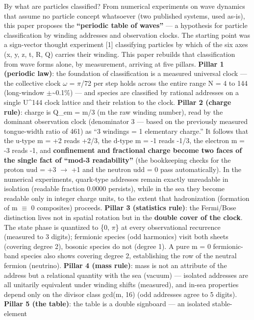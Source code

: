 \documentclass[
]{article}
\begin{document}
By what are particles classified? From numerical experiments on wave
dynamics that assume no particle concept whatsoever (two published
systems, used as-is), this paper proposes the \textbf{``periodic table
of waves''} --- a hypothesis for particle classification by winding
addresses and observation clocks. The starting point was a sign-vector
thought experiment {[}1{]} classifying particles by which of the six
axes (x, y, z, t, R, Q) carries their winding. This paper rebuilds that
classification from wave forms alone, by measurement, arriving at five
pillars. \textbf{Pillar 1 (periodic law)}: the foundation of
classification is a measured universal clock --- the collective clock
\(\omega\) = \(\pi\)/72 per step holds across the entire range N = 4 to
144 (long-window \(\pm\)\textasciitilde0.1\%) --- and species are
classified by rational addresses on a single U\^{}144 clock lattice and
their relation to the clock. \textbf{Pillar 2 (charge rule)}: charge is
Q\_em = m/3 (m the raw winding number), read by the dominant observation
clock (denominator 3 --- based on the previously measured tongue-width
ratio of 461) as ``3 windings = 1 elementary charge.'' It follows that
the u-type m = +2 reads +2/3, the d-type m = -1 reads -1/3, the electron
m = -3 reads -1, and \textbf{confinement and fractional charge become
two faces of the single fact of ``mod-3 readability''} (the bookkeeping
checks for the proton uud = +3 \(\to\) +1 and the neutron udd = 0 pass
automatically). In the numerical experiments, quark-type addresses
remain exactly unreadable in isolation (readable fraction 0.0000
persists), while in the sea they become readable only in integer charge
units, to the extent that hadronization (formation of m \(\equiv\) 0
composites) proceeds. \textbf{Pillar 3 (statistics rule)}: the
Fermi/Bose distinction lives not in spatial rotation but in the
\textbf{double cover of the clock}. The state phase is quantized to \{0,
\(\pi\)\} at every observational recurrence (measured to 3 digits);
fermionic species (odd harmonics) visit both sheets (covering degree 2),
bosonic species do not (degree 1). A pure m = 0 fermionic-band species
also shows covering degree 2, establishing the row of the neutral
fermion (neutrino). \textbf{Pillar 4 (mass rule)}: mass is not an
attribute of the address but a relational quantity with the sea (vacuum)
--- isolated addresses are all unitarily equivalent under winding shifts
(measured), and in-sea properties depend only on the divisor class
gcd(m, 16) (odd addresses agree to 5 digits). \textbf{Pillar 5 (the
table)}: the table is a double signboard --- an isolated stable-element
\end{document}
